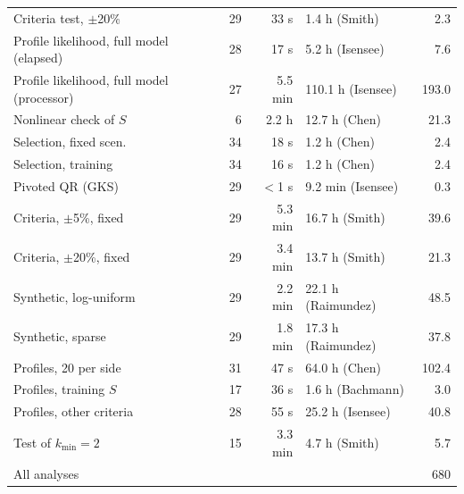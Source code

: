 \begin{longtable}{@{}lrrlr@{}}
Criteria test, $\pm$20\% & 29 & 33 s & 1.4 h (Smith) & 2.3 \\
Profile likelihood, full model (elapsed) & 28 & 17 s & 5.2 h (Isensee) & 7.6 \\
Profile likelihood, full model (processor) & 27 & 5.5 min & 110.1 h (Isensee) & 193.0 \\
Nonlinear check of $S$ & 6 & 2.2 h & 12.7 h (Chen) & 21.3 \\
Selection, fixed scen. & 34 & 18 s & 1.2 h (Chen) & 2.4 \\
Selection, training & 34 & 16 s & 1.2 h (Chen) & 2.4 \\
Pivoted QR (GKS) & 29 & $<$1 s & 9.2 min (Isensee) & 0.3 \\
Criteria, $\pm$5\%, fixed & 29 & 5.3 min & 16.7 h (Smith) & 39.6 \\
Criteria, $\pm$20\%, fixed & 29 & 3.4 min & 13.7 h (Smith) & 21.3 \\
Synthetic, log-uniform & 29 & 2.2 min & 22.1 h (Raimundez) & 48.5 \\
Synthetic, sparse & 29 & 1.8 min & 17.3 h (Raimundez) & 37.8 \\
Profiles, 20 per side & 31 & 47 s & 64.0 h (Chen) & 102.4 \\
Profiles, training $S$ & 17 & 36 s & 1.6 h (Bachmann) & 3.0 \\
Profiles, other criteria & 28 & 55 s & 25.2 h (Isensee) & 40.8 \\
Test of $k_{\min}=2$ & 15 & 3.3 min & 4.7 h (Smith) & 5.7 \\
\midrule
All analyses & & & & 680 \\
\bottomrule
\end{longtable}
